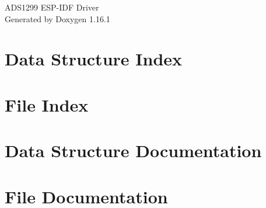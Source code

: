 \documentclass[twoside]{book}
\newcommand{\+}{\discretionary{\mbox{\scriptsize$\hookleftarrow$}}{}{}}
\newcommand{\clearemptydoublepage}{%
    \newpage{\pagestyle{empty}\cleardoublepage}%
  }
\begin{document}
  \raggedbottom
    \hypersetup{pageanchor=false,
                bookmarksnumbered=true,
                pdfencoding=unicode
               }
  \begin{titlepage}
  \vspace*{7cm}
  \begin{center}%
  {\Large ADS1299 ESP-\/\+IDF Driver}\\
  \vspace*{1cm}
  {\large Generated by Doxygen 1.16.1}\\
  \end{center}
  \end{titlepage}
  \clearemptydoublepage
  \tableofcontents
  \clearemptydoublepage
  \hypersetup{pageanchor=true}
\chapter{Data Structure Index}

\chapter{File Index}

\chapter{Data Structure Documentation}






\chapter{File Documentation}




  \backmatter
  \newpage
  \clearemptydoublepage
  \printindex
\end{document}
